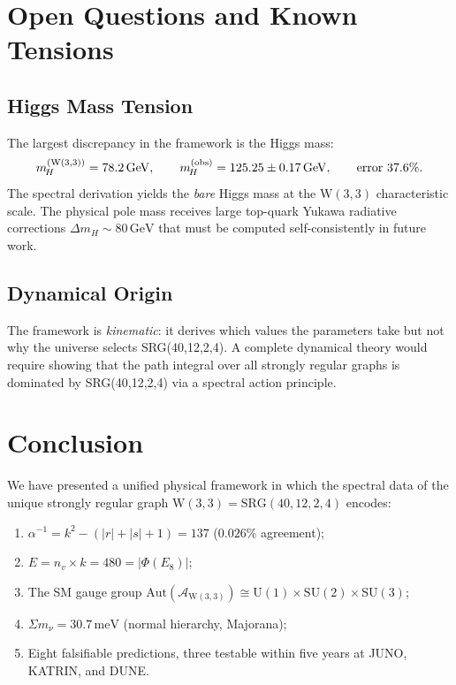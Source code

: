 \documentclass[12pt,a4paper]{article}
\newcommand{\W}{\mathrm{W}(3,3)}
\newcommand{\SRG}{\mathrm{SRG}}
\newcommand{\Eone}{E_8}
\newcommand{\nv}{n_{\!v}}
\newcommand{\mH}{m_{\!H}}
\newcommand{\sumnu}{\Sigma m_\nu}
\begin{document}
\section{Open Questions and Known Tensions}
\label{sec:open}

\subsection{Higgs Mass Tension}

The largest discrepancy in the framework is the Higgs mass:
\[
  \mH^{(\W)} = 78.2\,\mathrm{GeV}, \qquad
  \mH^{(\rm obs)} = 125.25\pm 0.17\,\mathrm{GeV}, \qquad
  \text{error } 37.6\%.
\]
The spectral derivation yields the \emph{bare} Higgs mass at the
$\W$ characteristic scale. The physical pole mass receives large
top-quark Yukawa radiative corrections $\Delta\mH \sim 80\,\mathrm{GeV}$
that must be computed self-consistently in future work.

\subsection{Dynamical Origin}

The framework is \emph{kinematic}: it derives which values the
parameters take but not why the universe selects SRG(40,12,2,4).
A complete dynamical theory would require showing that the path
integral over all strongly regular graphs is dominated by
SRG(40,12,2,4) via a spectral action principle.

\section{Conclusion}
\label{sec:conclusion}

We have presented a unified physical framework in which the spectral
data of the unique strongly regular graph $\W = \SRG(40,12,2,4)$
encodes:
\begin{enumerate}
  \item $\alpha^{-1} = k^2 - (|r|+|s|+1) = 137$ ($0.026\%$ agreement);
  \item $E = \nv\times k = 480 = |\Phi(\Eone)|$;
  \item The SM gauge group
        $\mathrm{Aut}(\mathcal{A}_{\W})\cong
         \mathrm{U}(1)\times\mathrm{SU}(2)\times\mathrm{SU}(3)$;
  \item $\sumnu = 30.7\,\mathrm{meV}$ (normal hierarchy, Majorana);
  \item Eight falsifiable predictions, three testable within five
        years at JUNO, KATRIN, and DUNE.
\end{enumerate}
\end{document}
